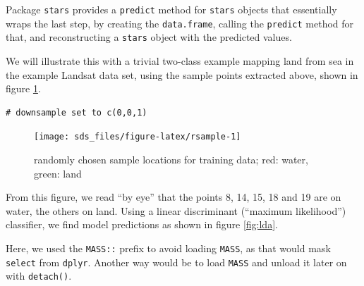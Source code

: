 \documentclass[]{book}
\newenvironment{Shaded}{\begin{snugshade}}{\end{snugshade}}
\newcommand{\DecValTok}[1]{\textcolor[rgb]{0.00,0.00,0.81}{#1}}
\newcommand{\KeywordTok}[1]{\textcolor[rgb]{0.13,0.29,0.53}{\textbf{#1}}}
\newcommand{\NormalTok}[1]{#1}
\newcommand{\OperatorTok}[1]{\textcolor[rgb]{0.81,0.36,0.00}{\textbf{#1}}}
\newcommand{\OtherTok}[1]{\textcolor[rgb]{0.56,0.35,0.01}{#1}}
\newcommand{\StringTok}[1]{\textcolor[rgb]{0.31,0.60,0.02}{#1}}
\begin{document}
Package \texttt{stars} provides a \texttt{predict} method for \texttt{stars} objects
that essentially wraps the last step, by creating the \texttt{data.frame},
calling the \texttt{predict} method for that, and reconstructing a \texttt{stars}
object with the predicted values.

We will illustrate this with a trivial two-class example mapping
land from sea in the example Landsat data set, using the sample
points extracted above, shown in figure \ref{fig:rsample}.

\begin{verbatim}
# downsample set to c(0,0,1)
\end{verbatim}

\begin{figure}

{\centering \texttt{[image: sds\_files/figure-latex/rsample-1]} 

}

\caption{randomly chosen sample locations for training data; red: water, green: land}\label{fig:rsample}
\end{figure}

From this figure, we read ``by eye'' that the points 8, 14, 15, 18 and
19 are on water, the others on land. Using a linear discriminant
(``maximum likelihood'') classifier, we find model predictions as
shown in figure \ref{fig:lda}.

\begin{Shaded}
\end{Shaded}

Here, we used the \texttt{MASS::} prefix to avoid loading \texttt{MASS}, as that
would mask \texttt{select} from \texttt{dplyr}. Another way would be to load
\texttt{MASS} and unload it later on with \texttt{detach()}.
\end{document}
